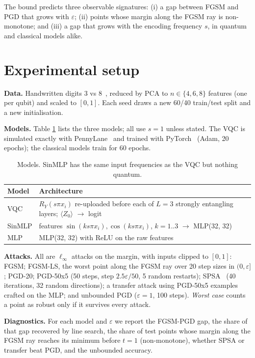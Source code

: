 \documentclass[11pt]{article}
\begin{document}
The bound predicts three observable signatures: (i) a gap between FGSM and PGD that grows with $\varepsilon$; (ii) points whose margin along the FGSM ray is non-monotone; and (iii) a gap that grows with the encoding frequency $s$, in quantum and classical models alike.

\section{Experimental setup}\label{sec:setup}
\textbf{Data.} Handwritten digits 3 vs 8~\cite{digits}, reduced by PCA to $n\in\{4,6,8\}$ features (one per qubit) and scaled to $[0,1]$. Each seed draws a new 60/40 train/test split and a new initialisation.

\textbf{Models.} Table \ref{tab:models} lists the three models; all use $s=1$ unless stated. The VQC is simulated exactly with PennyLane~\cite{pennylane} and trained with PyTorch~\cite{pytorch} (Adam, 20 epochs); the classical models train for 60 epochs.

\begin{table}[t]
\centering
\caption{Models. SinMLP has the same input frequencies as the VQC but nothing quantum.}
\label{tab:models}
\small
\begin{tabular}{ll}
\toprule
\textbf{Model} & \textbf{Architecture} \\
\midrule
VQC & $R_Y(s\pi x_i)$ re-uploaded before each of $L=3$ strongly entangling layers; $\langle Z_0\rangle$ $\rightarrow$ logit \\
SinMLP & features $\sin(k s\pi x_i),\cos(k s\pi x_i)$, $k=1..3$ $\rightarrow$ MLP(32, 32) \\
MLP & MLP(32, 32) with ReLU on the raw features \\
\bottomrule
\end{tabular}
\end{table}

\textbf{Attacks.} All are $\ell_\infty$ attacks on the margin, with inputs clipped to $[0,1]$: FGSM; FGSM-LS, the worst point along the FGSM ray over 20 step sizes in $(0,\varepsilon]$; PGD-20; PGD-50x5 (50 steps, step $2.5\varepsilon/50$, 5 random restarts); SPSA~\cite{uesato2018} (40 iterations, 32 random directions); a transfer attack using PGD-50x5 examples crafted on the MLP; and unbounded PGD ($\varepsilon=1$, 100 steps). \emph{Worst case} counts a point as robust only if it survives every attack.

\textbf{Diagnostics.} For each model and $\varepsilon$ we report the FGSM-PGD gap, the share of that gap recovered by line search, the share of test points whose margin along the FGSM ray reaches its minimum before $t=1$ (non-monotone), whether SPSA or transfer beat PGD, and the unbounded accuracy.
\end{document}
